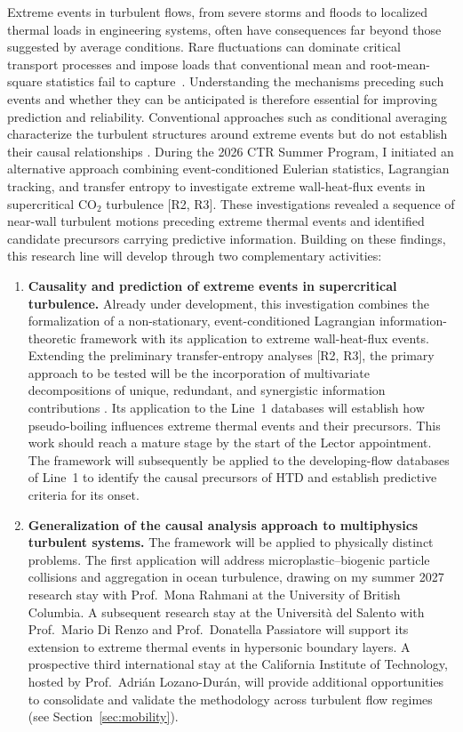 \documentclass[11pt]{article}
\begin{document}
Extreme events in turbulent flows, from severe storms and floods to localized thermal loads in engineering systems, often have consequences far beyond those suggested by average conditions.
Rare fluctuations can dominate critical transport processes and impose loads that conventional mean and root-mean-square statistics fail to capture~\cite{Guerrero2020}.
Understanding the mechanisms preceding such events and whether they can be anticipated is therefore essential for improving prediction and reliability.
Conventional approaches such as conditional averaging characterize the turbulent structures around extreme events but do not establish their causal relationships \cite{Hack2021,Zhang2023}.
During the 2026 CTR Summer Program, I initiated an alternative approach combining event-conditioned Eulerian statistics, Lagrangian tracking, and transfer entropy to investigate extreme wall-heat-flux events in supercritical CO$_2$ turbulence [R2, R3].
These investigations revealed a sequence of near-wall turbulent motions preceding extreme thermal events and identified candidate precursors carrying predictive information.
Building on these findings, this research line will develop through two complementary activities:
\begin{enumerate}
	\item \textbf{Causality and prediction of extreme events in supercritical turbulence.}
	Already under development, this investigation combines the formalization of a non-stationary, event-conditioned Lagrangian information-theoretic framework with its application to extreme wall-heat-flux events.
	Extending the preliminary transfer-entropy analyses [R2, R3], the primary approach to be tested will be the incorporation of multivariate decompositions of unique, redundant, and synergistic information contributions \cite{MartinezSanchez2024}.
	Its application to the Line~1 databases will establish how pseudo-boiling influences extreme thermal events and their precursors.
	This work should reach a mature stage by the start of the Lector appointment.
	The framework will subsequently be applied to the developing-flow databases of Line~1 to identify the causal precursors of HTD and establish predictive criteria for its onset.
	
	\item \textbf{Generalization of the causal analysis approach to multiphysics turbulent systems.}
	The framework will be applied to physically distinct problems.
	The first application will address microplastic--biogenic particle collisions and aggregation in ocean turbulence, drawing on my summer 2027 research stay with Prof.~Mona Rahmani at the University of British Columbia.
	A subsequent research stay at the Universit\`a del Salento with Prof.~Mario Di Renzo and Prof.~Donatella Passiatore will support its extension to extreme thermal events in hypersonic boundary layers.
	A prospective third international stay at the California Institute of Technology, hosted by Prof.~Adrián Lozano-Durán, will provide additional opportunities to consolidate and validate the methodology across turbulent flow regimes (see Section~\ref{sec:mobility}).
\end{enumerate}
\end{document}
